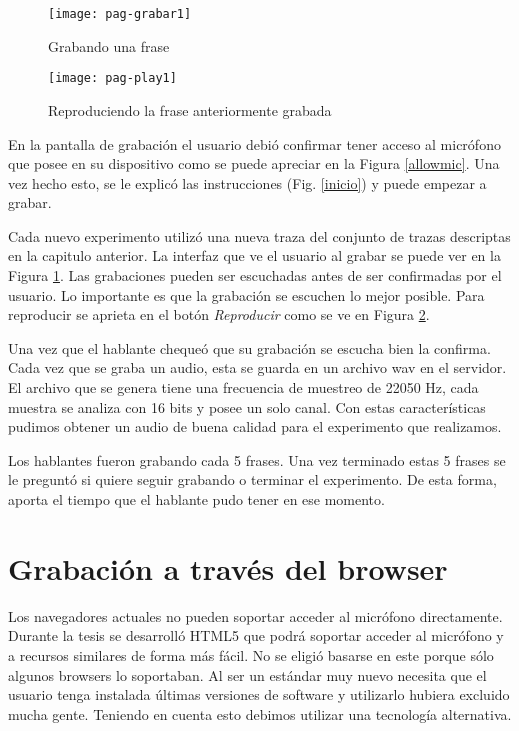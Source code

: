 \begin{figure}[h!]
    \centerline{\texttt{[image: pag-grabar1]} }
    \caption{Grabando una frase}
    \label{grabando}
\end{figure}

\begin{figure}[h!]
    \centerline{\texttt{[image: pag-play1]} }
    \caption{Reproduciendo la frase anteriormente grabada}
    \label{reproduciendo}
\end{figure}

En la pantalla de grabación el usuario debió confirmar tener acceso al micrófono que posee en su dispositivo como se puede apreciar en la Figura \ref{allowmic}. Una vez hecho esto, se le explicó las instrucciones (Fig. \ref{inicio}) y puede empezar a grabar. 

Cada nuevo experimento utilizó una nueva traza del conjunto de trazas descriptas en la capitulo anterior. La interfaz que ve el usuario al grabar se puede ver en la Figura \ref{grabando}. Las grabaciones pueden ser escuchadas antes de ser confirmadas por el usuario. Lo importante es que la grabación se escuchen lo mejor posible. Para reproducir se aprieta en el botón \textit{Reproducir} como se ve en Figura \ref{reproduciendo}. 

Una vez que el hablante chequeó que su grabación se escucha bien la confirma. Cada vez que se graba un audio, esta se guarda en un archivo wav en el servidor. El archivo que se genera tiene una frecuencia de muestreo de 22050 Hz, cada muestra se analiza con 16 bits y posee un solo canal. Con estas características pudimos obtener un audio de buena calidad para el experimento que realizamos.

Los hablantes fueron grabando cada 5 frases. Una vez terminado estas 5 frases se le preguntó si quiere seguir grabando o terminar el experimento. De esta forma, aporta el tiempo que el hablante pudo tener en ese momento.

\section{Grabación a través del browser}

Los navegadores actuales no pueden soportar acceder al micrófono directamente. Durante la tesis se desarrolló HTML5 que podrá soportar acceder al micrófono y a recursos similares de forma más fácil. No se eligió basarse en este porque sólo algunos browsers lo soportaban. Al ser un estándar muy nuevo necesita que el usuario tenga instalada últimas versiones de software y utilizarlo hubiera excluido mucha gente. Teniendo en cuenta esto debimos utilizar una tecnología alternativa. 


